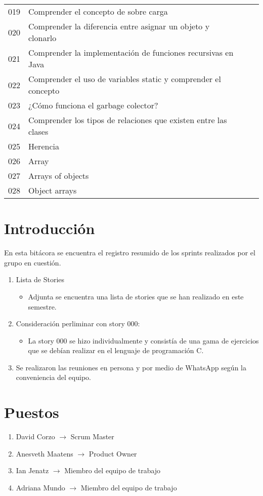 \begin{center}
\begin{tabular}{ | p{1cm} | p{13cm} | p{1cm} | p{1.25cm} | }
        019 & Comprender el concepto de sobre carga & &   \\
        020 & Comprender la diferencia entre asignar un objeto y clonarlo & &   \\
        021 & Comprender la implementación de funciones recursivas en Java & &   \\
        022 & Comprender el uso de variables static y comprender el concepto & &   \\
        023 & ¿Cómo funciona el garbage colector? & &   \\
        024 & Comprender los tipos de relaciones que existen entre las clases & &   \\
        025 & Herencia & &   \\
        026 & Array & &   \\
        027 & Arrays of objects & &   \\
        028 & Object arrays & &   \\ 
        \hline
   \end{tabular}
\end{center}

\section{Introducción}
En esta bitácora se encuentra el registro resumido de los sprints realizados por el grupo en cuestión. 

\begin{enumerate}
    \item Lista de Stories
        \begin{itemize}
            \item Adjunta se encuentra una lista de stories que se han realizado en este semestre.
        \end{itemize}
    
    \item Consideración perliminar con story 000:
        \begin{itemize}
            \item La story 000 se hizo individualmente y consistía de una gama de ejercicios que se debían realizar en el lenguaje de programación C.
        \end{itemize}
    
    \item Se realizaron las reuniones en persona y por medio de WhatsApp según la conveniencia del equipo.
\end{enumerate}


\section{Puestos}
\begin{enumerate}
    \item David Corzo $\rightarrow$ Scrum Master
    \item Anesveth Maatens $\rightarrow$ Product Owner
    \item Ian Jenatz $\rightarrow$ Miembro del equipo de trabajo
    \item Adriana Mundo $\rightarrow$ Miembro del equipo de trabajo
\end{enumerate}

